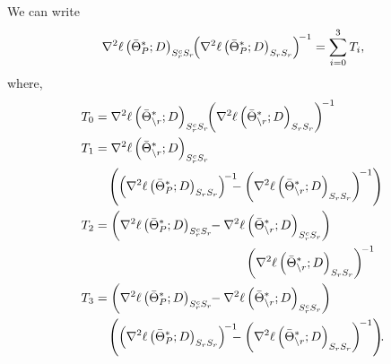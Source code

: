  We can write
\begin{equation}
\nabla^2\ell\left(\bar{\Theta}^*_P;D\right)_{S_{r}^cS_{r}}\!\! \left(\nabla^2\ell\left(\bar{\Theta}^*_P;D\right)_{S_{r}S_{r}}\right)^{\!-1}=\sum_{i=0}^3T_i,
\nonumber
\end{equation}
where,
\footnotesize\begin{equation}
\begin{aligned}
T_0&=\nabla^2\ell\left(\bar{\Theta}^*_{\backslash\svert};D\right)_{\support_\svert^c\support_\svert}\!\! \left(\nabla^2\ell\left(\bar{\Theta}^*_{\backslash\svert};D\right)_{\support_\svert\support_\svert}\right)^{\!-1}\\
T_1&=\nabla^2\ell\left(\bar{\Theta}^*_{\backslash\svert};D\right)_{\support_\svert^c\support_\svert}\\ &\quad\left(\left(\nabla^2\ell\left(\bar{\Theta}^*_P;D\right)_{\support_\svert\support_\svert}\right)^{\!-1} \!\!\!\!-\left(\nabla^2\ell\left(\bar{\Theta}^*_{\backslash\svert};D\right)_{\support_\svert\support_\svert}\right)^{\!-1}\right)\\
T_2&=\left(\nabla^2\ell\left(\bar{\Theta}^*_P;D\right)_{\support_\svert^c\support_\svert}\!\! -\nabla^2\ell\left(\bar{\Theta}^*_{\backslash\svert};D\right)_{\support_\svert^c\support_\svert}\right)\\ &\qquad\qquad\qquad\qquad\qquad\qquad\left(\nabla^2\ell\left(\bar{\Theta}^*_{\backslash\svert};D\right)_{\support_\svert\support_\svert}\right)^{\!-1}\\
T_3&=\left(\nabla^2\ell\left(\bar{\Theta}^*_P;D\right)_{\support_\svert^c\support_\svert}\!\! -\nabla^2\ell\left(\bar{\Theta}^*_{\backslash\svert};D\right)_{\support_\svert^c\support_\svert}\right)\\ &\quad\left(\left(\nabla^2\ell\left(\bar{\Theta}^*_P;D\right)_{\support_\svert\support_\svert}\right)^{\!-1} \!\!\!\!-\left(\nabla^2\ell\left(\bar{\Theta}^*_{\backslash\svert};D\right)_{\support_\svert\support_\svert}\right)^{\!-1}\right)\!\!.\\
\end{aligned}
\nonumber
\end{equation}\normalsize

